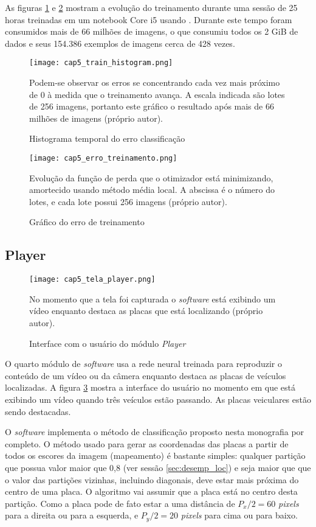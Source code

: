 As figuras \ref{fig:cap5_train_histogram} e \ref{fig:cap5_erro_treinamento}
mostram a evolução do treinamento durante uma sessão de 25
horas treinadas em um notebook Core i5 usando . Durante este tempo foram
consumidos mais de 66 milhões de imagens, o que consumiu todos os 2 GiB de
dados e seus 154.386 exemplos de imagens cerca de 428 vezes.

\begin{figure}[!htb]
	\centering
	\texttt{[image: cap5\_train\_histogram.png]}
	\caption{Histograma temporal do erro classificação}
	\label{fig:cap5_train_histogram}
	Podem-se observar os erros se concentrando cada vez mais próximo de 0 à
	medida que o treinamento avança. A escala indicada são lotes de 256
	imagens, portanto este gráfico o resultado após mais de 66 milhões de
	imagens (próprio autor).
\end{figure}

\begin{figure}[!htb]
	\centering
	\texttt{[image: cap5\_erro\_treinamento.png]}
	\caption{Gráfico do erro de treinamento}
	\label{fig:cap5_erro_treinamento}
	Evolução da função de perda que o otimizador está minimizando, amortecido
	usando método média local. A abscissa é o número do lotes, e cada lote
	possui 256 imagens (próprio autor).
\end{figure}

\subsection{Player}

\begin{figure}[!htb]
	\centering
	\texttt{[image: cap5\_tela\_player.png]}
	\caption{Interface com o usuário do módulo \emph{Player}}
	\label{fig:cap5_tela_player}
	No momento que a tela foi capturada o \emph{software} está exibindo um
	vídeo enquanto destaca as placas que está localizando (próprio autor).
\end{figure}

O quarto módulo de \emph{software} usa a rede neural treinada para reproduzir o
conteúdo de um vídeo ou da câmera enquanto destaca as placas de veículos
localizadas. A figura \ref{fig:cap5_tela_player} mostra a interface do usuário
no momento em que está exibindo um vídeo quando três veículos estão passando.
As placas veiculares estão sendo destacadas.

O \emph{software} implementa o método de classificação proposto nesta
monografia por completo. O método usado para gerar as coordenadas das placas a
partir de todos os escores da imagem (mapeamento) é bastante simples: qualquer
partição que possua valor maior que 0,8 (ver sessão \ref{sec:desemp_loc})
e seja maior que que o valor das
partições vizinhas, incluindo diagonais, deve estar mais próxima do centro de
uma placa. O algoritmo vai assumir que a placa está no centro desta partição.
Como a placa pode de fato estar a uma distância de $P_x/2=60$ \emph{pixels}
para a direita ou para a esquerda, e $P_y/2=20$ \emph{pixels} para cima ou para
baixo.

